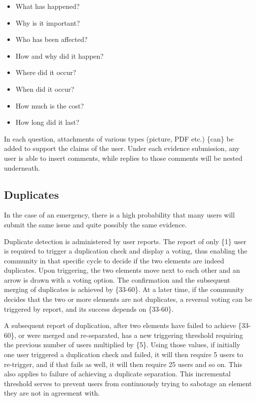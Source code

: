 \documentclass[a4paper,11pt]{article}
\begin{document}
\begin{multicols}{2}
\begin{itemize}
\item What has happened?
\item Why is it important?
\item Who has been affected?
\item How and why did it happen?
\item Where did it occur?
\item When did it occur?
\item How much is the cost?
\item How long did it last?
\end{itemize}

In each question, attachments of various types (picture, PDF etc.) \{can\} be added to support the claims of the user. Under each evidence submission, any user is able to insert comments, while replies to those comments will be nested underneath.

\subsection{Duplicates} \label{duplicates}

In the case of an emergency, there is a high probability that many users will submit the same issue and quite possibly the same evidence.

Duplicate detection is administered by user reports. The report of only \{1\} user is required to trigger a duplication check and display a voting, thus enabling the community in that specific cycle to decide if the two elements are indeed duplicates. Upon triggering, the two elements move next to each other and an arrow is drawn with a voting option. The confirmation and the subsequent merging of duplicates is achieved by \{33-60\}. At a later time, if the community decides that the two or more elements are not duplicates, a reversal voting can be triggered by report, and its success depends on \{33-60\}.

A subsequent report of duplication, after two elements have failed to achieve \{33-60\}, or were merged and re-separated, has a new triggering threshold requiring the previous number of users multiplied by \{5\}. Using those values, if initially one user triggered a duplication check and failed, it will then require 5 users to re-trigger, and if that fails as well, it will then require 25 users and so on. This also applies to failure of achieving a duplicate separation. This incremental threshold serves to prevent users from continuously trying to sabotage an element they are not in agreement with.


\end{multicols}
\end{document}
